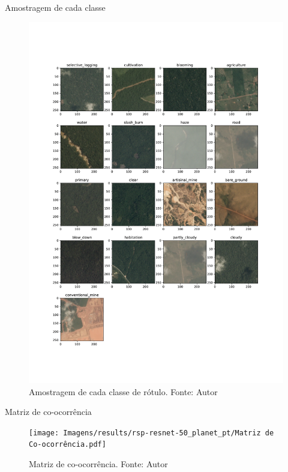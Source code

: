 \documentclass[8pt]{beamer}
\begin{document}
\begin{frame}{Amostragem de cada classe}
    \begin{figure}[!ht]
        \centering
        \includegraphics[width=0.7\textheight]{Imagens/results/rsp-resnet-50_planet_pt/Amostras de cada classe.pdf}
        \caption{Amostragem de cada classe de rótulo.
        Fonte: Autor}
       \label{fig:classes}
    \end{figure}
        
\end{frame}
    

\begin{frame}{Matriz de co-ocorrência}
    \begin{figure}[!ht]
        \centering
        \texttt{[image: Imagens/results/rsp-resnet-50\_planet\_pt/Matriz de Co-ocorrência.pdf]}
        \caption{Matriz de co-ocorrência.
        Fonte: Autor}
       \label{fig:coocorrencia}
    \end{figure}    
\end{frame}
\end{document}
